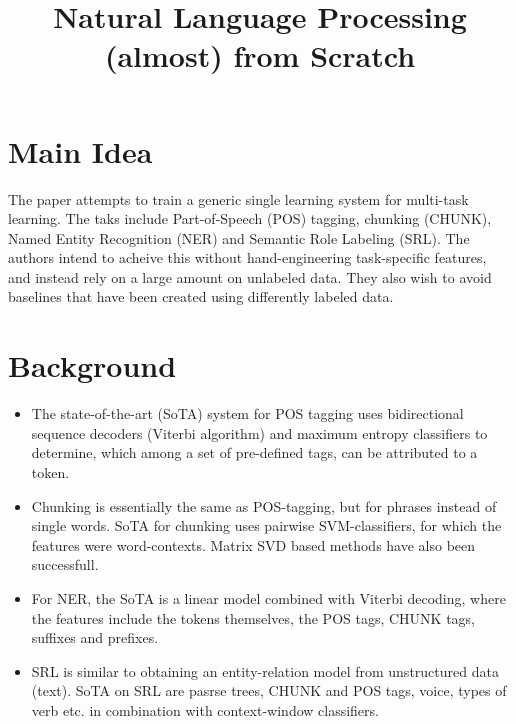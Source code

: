 \documentclass[12pt]{scrartcl}
\begin{document}
\title{Natural Language Processing (almost) from Scratch}
\author{}
\date{}
\maketitle

\section{Main Idea}
  The paper \cite{collobert2011natural} attempts to train a generic single learning system for multi-task learning. The taks include Part-of-Speech (POS) tagging, chunking (CHUNK), Named Entity Recognition (NER) and Semantic Role Labeling (SRL). The authors intend to acheive this without hand-engineering task-specific features, and instead rely on a large amount on unlabeled data. They also wish to avoid baselines that have been created using differently labeled data.
  
\section{Background}
  \begin{itemize}
    \item The state-of-the-art (SoTA) system for POS tagging uses bidirectional sequence decoders (Viterbi algorithm) and maximum entropy classifiers to determine, which among a set of pre-defined tags, can be attributed to a token.
    \item Chunking is essentially the same as POS-tagging, but for phrases instead of single words. SoTA for chunking uses pairwise SVM-classifiers, for which the features were word-contexts. Matrix SVD based methods have also been successfull.
    \item For NER, the SoTA is a linear model combined with Viterbi decoding, where the features include the tokens themselves, the POS tags, CHUNK tags, suffixes and prefixes.
    \item SRL is similar to obtaining an entity-relation model from unstructured data (text). SoTA on SRL are pasrse trees, CHUNK and POS tags, voice, types of verb etc. in combination with context-window classifiers.
  \end{itemize}
\end{document}

